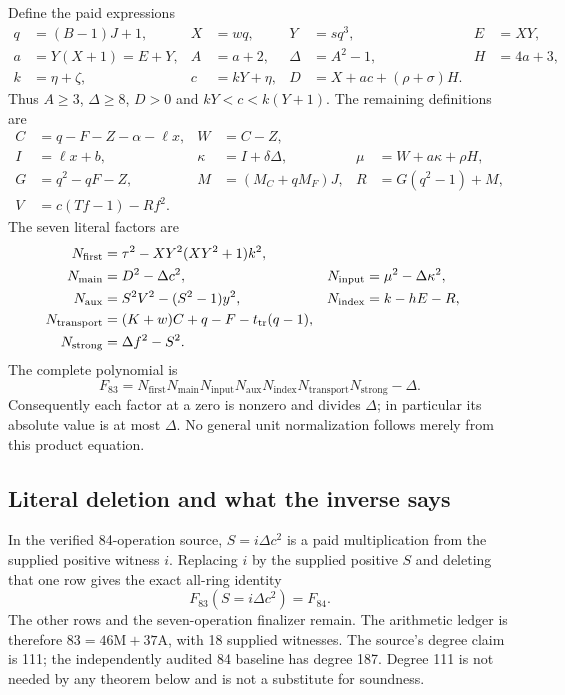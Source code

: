 \documentclass[11pt,letterpaper]{article}
\theoremstyle{definition}\newtheorem{definition}[theorem]{Definition}
\theoremstyle{remark}\newtheorem{remark}[theorem]{Remark}
\newcommand{\D}{\Delta}
\newcommand{\Nf}{N_{\mathrm{first}}}\newcommand{\Nm}{N_{\mathrm{main}}}\newcommand{\Ni}{N_{\mathrm{input}}}
\newcommand{\Na}{N_{\mathrm{aux}}}\newcommand{\Nk}{N_{\mathrm{index}}}\newcommand{\Nt}{N_{\mathrm{transport}}}
\newcommand{\Ns}{N_{\mathrm{strong}}}
\begin{document}
Define the paid expressions
\begin{align}
 q&=(B-1)J+1,&X&=wq,&Y&=sq^3,&E&=XY,\\
 a&=Y(X+1)=E+Y,&A&=a+2,&\D&=A^2-1,&H&=4a+3,\\
 k&=\eta+\zeta,&c&=kY+\eta,&D&=X+ac+(\rho+\sigma)H.\label{fup:fc:eq:base}
\end{align}
Thus $A\ge3$, $\D\ge8$, $D>0$ and $kY<c<k(Y+1)$.
The remaining definitions are
\begin{align}
 C&=q-F-Z-\alpha-\ell x,&W&=C-Z,\\
 I&=\ell x+b,&\kappa&=I+\delta\D,&\mu&=W+a\kappa+\rho H,\\
 G&=q^2-qF-Z,&M&=(M_C+qM_F)J,&R&=G(q^2-1)+M,\\
 V&=c(Tf-1)-Rf^2.\label{fup:fc:eq:ports}
\end{align}
The seven literal factors are
\begin{align}
 \Nf&=\tau^2-XY^2(XY^2+1)k^2,\\
 \Nm&=D^2-\D c^2,&\Ni&=\mu^2-\D\kappa^2,\\
 \Na&=S^2V^2-(S^2-1)y^2,&\Nk&=k-hE-R,\\
 \Nt&=(K+w)C+q-F-t_{\rm tr}(q-1),\\
 \Ns&=\D f^2-S^2.
\end{align}
The complete polynomial is
\begin{equation}
 F_{83}=\Nf\Nm\Ni\Na\Nk\Nt\Ns-\D.\label{fup:fc:eq:full}
\end{equation}
Consequently each factor at a zero is nonzero and divides $\D$; in
particular its absolute value is at most $\D$. No general unit
normalization follows merely from this product equation.

\subsection{Literal deletion and what the inverse says}
In the verified 84-operation source, $S=i\D c^2$ is a paid multiplication
from the supplied positive witness $i$. Replacing $i$ by the supplied
positive $S$ and deleting that one row gives the exact all-ring identity
\begin{equation}
 F_{83}(S=i\D c^2)=F_{84}.\label{fup:fc:eq:forward}
\end{equation}
The other rows and the seven-operation finalizer remain. The arithmetic
ledger is therefore $83=46\mathrm M+37\mathrm A$, with 18 supplied
witnesses. The source's degree claim is 111; the independently audited
84 baseline has degree 187. Degree 111 is not needed by any theorem below
and is not a substitute for soundness.
\end{document}
